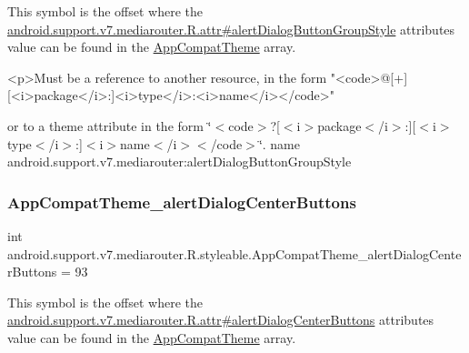 This symbol is the offset where the \hyperlink{classandroid_1_1support_1_1v7_1_1mediarouter_1_1R_1_1attr_a5abc9f8681fe2ef897c9686b07af82ea}{android.\+support.\+v7.\+mediarouter.\+R.\+attr\#alert\+Dialog\+Button\+Group\+Style} attribute\textquotesingle{}s value can be found in the \hyperlink{classandroid_1_1support_1_1v7_1_1mediarouter_1_1R_1_1styleable_a4e3d3900c75d49aeb2f283cac00214d6}{App\+Compat\+Theme} array.

\begin{DoxyVerb}      <p>Must be a reference to another resource, in the form "<code>@[+][<i>package</i>:]<i>type</i>:<i>name</i></code>"
\end{DoxyVerb}
 or to a theme attribute in the form \char`\"{}$<$code$>$?\mbox{[}$<$i$>$package$<$/i$>$\+:\mbox{]}\mbox{[}$<$i$>$type$<$/i$>$\+:\mbox{]}$<$i$>$name$<$/i$>$$<$/code$>$\char`\"{}.  name android.\+support.\+v7.\+mediarouter\+:alert\+Dialog\+Button\+Group\+Style \mbox{\label{classandroid_1_1support_1_1v7_1_1mediarouter_1_1R_1_1styleable_abcca492d47ce112a675f207ef0498cf8}} 
\subsubsection{\texorpdfstring{App\+Compat\+Theme\+\_\+alert\+Dialog\+Center\+Buttons}{AppCompatTheme\_alertDialogCenterButtons}}
{\footnotesize\ttfamily int android.\+support.\+v7.\+mediarouter.\+R.\+styleable.\+App\+Compat\+Theme\+\_\+alert\+Dialog\+Center\+Buttons = 93\hspace{0.3cm}{\ttfamily [static]}}

This symbol is the offset where the \hyperlink{classandroid_1_1support_1_1v7_1_1mediarouter_1_1R_1_1attr_a6ba9929beb9756974cd9b8c42dff7857}{android.\+support.\+v7.\+mediarouter.\+R.\+attr\#alert\+Dialog\+Center\+Buttons} attribute\textquotesingle{}s value can be found in the \hyperlink{classandroid_1_1support_1_1v7_1_1mediarouter_1_1R_1_1styleable_a4e3d3900c75d49aeb2f283cac00214d6}{App\+Compat\+Theme} array.

